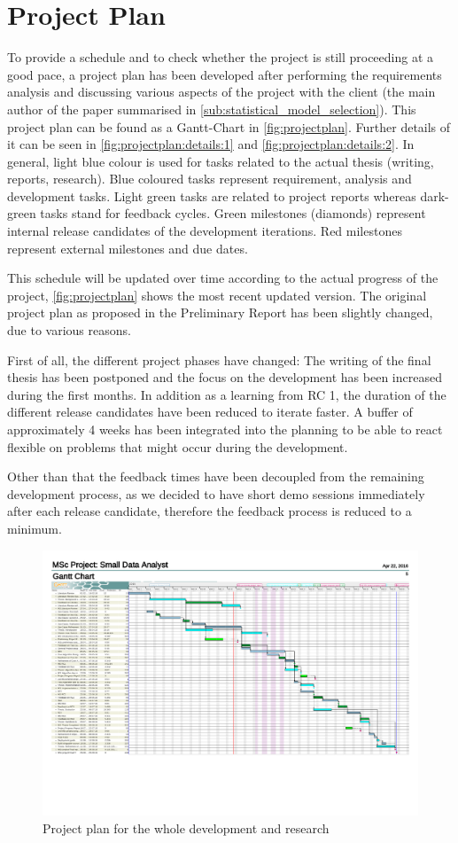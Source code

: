 \section{Project Plan}
\label{sec:projectplan}
To provide a schedule and to check whether the project is still proceeding at a good pace, a project plan has been developed after performing the requirements analysis and discussing various aspects of the project with the client (the main author of the paper summarised in \autoref{sub:statistical_model_selection}). This project plan can be found as a Gantt-Chart in \autoref{fig:projectplan}. Further details of it can be seen in \autoref{fig:projectplan:details:1} and \autoref{fig:projectplan:details:2}. In general, light blue colour is used for tasks related to the actual thesis (writing, reports, research). Blue coloured tasks represent requirement, analysis and development tasks. Light green tasks are related to project reports whereas dark-green tasks stand for feedback cycles. Green milestones (diamonds) represent internal release candidates of the development iterations. Red milestones represent external milestones and due dates. 

This schedule will be updated over time according to the actual progress of the project, \autoref{fig:projectplan} shows the most recent updated version. 
The original project plan as proposed in the Preliminary Report has been slightly changed, due to various reasons. 

First of all, the different project phases have changed: The writing of the final thesis has been postponed and the focus on the development has been increased during the first months. In addition as a learning from RC 1, the duration of the different release candidates have been reduced to iterate faster. A buffer of approximately 4 weeks has been integrated into the planning to be able to react flexible on problems that might occur during the development. 

Other than that the feedback times have been decoupled from the remaining development process, as we decided to have short demo sessions immediately after each release candidate, therefore the feedback process is reduced to a minimum.

\begin{figure}
	\centering
	\includegraphics[width=\textwidth]{appendix/Projectplan}
	\caption{Project plan for the whole development and research}
	\label{fig:projectplan}
\end{figure}
\restoregeometry